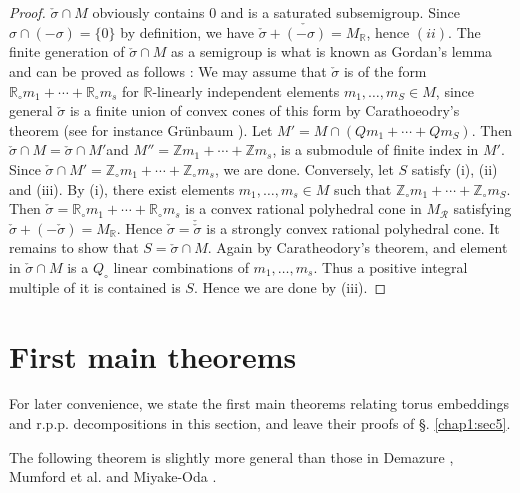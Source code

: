 \begin{proof}
$\check{\sigma} \cap M$ obviously contains 0 and is a saturated
  subsemigroup. Since $\sigma \cap (- \sigma) = \{ 0\}$ by definition,
  we have $\check{\sigma} + \check{(-\sigma)} = M_{\mathbb{R}}$, hence
  $(ii)$. The finite generation of $\check{\sigma} \cap M$ as a
  semigroup is what is known as Gordan's lemma and can be proved as
  follows : We may assume that $\check{\sigma}$ is of the form
  $\mathbb{R}_\circ m_1 +\cdots + \mathbb{R}_\circ m_s$ for
  $\mathbb{R}$-linearly independent elements $m_1 , \ldots , m_S \in
  M$, since general $\check{\sigma}$ is a finite union of convex cones
  of this form by Carathoeodry's theorem (see for instance
  Gr\"{u}nbaum  \cite{keyG3}). Let $M' = M \cap (Qm_1+\cdots+ Qm_S)$. Then
  $\check{\sigma}\cap M = \check{\sigma} \cap M'$\pageoriginale and
  $M''=\mathbb{Z} m_1+\cdots+\mathbb{Z} m_s$, is a submodule of finite
  index in $M'$. Since $\check{\sigma} \cap M' = \mathbb{Z}_\circ m_1
  + \cdots + \mathbb{Z}_\circ m_s $, we are done. Conversely, let 
  $S$ satisfy (i), (ii) and (iii). By (i), there exist elements
  $m_1 , \ldots, m_s \in M$ such that $\mathbb{Z}_\circ m_1 +\cdots +
  \mathbb{Z}_\circ m_S$. Then $\check{\sigma} = \mathbb{R}_\circ m_1
  +\cdots + \mathbb{R}_\circ m_s$ is a convex rational polyhedral cone
  in $M_{\mathscr{R}}$ satisfying $\check{\sigma} + (-\check{\sigma})
  = M_{\mathbb{R}}$. Hence $\check{\sigma} = \check{\check{\sigma}} $ is a
  strongly convex rational polyhedral cone. It remains to show that $S
  = \check{\sigma} \cap M$. Again by Caratheodory's theorem, and
  element in $\check{\sigma} \cap M$ is a $Q_\circ$ linear
  combinations of $m_1 ,\ldots , m_s$. Thus a positive integral
  multiple of it is contained is $S$. Hence we are done by (iii).  
\end{proof}

\section{First main theorems}\label{chap1:sec4}

	For later convenience, we state the first main theorems
        relating torus embeddings and r.p.p. decompositions in this
        section, and leave their proofs of \S. \ref{chap1:sec5}.  

	The following theorem is slightly more general than those in
        Demazure \cite[\S. \ref{chap1:sec4}]{keyD2}, Mumford et
        al.\cite[I.2, Thm.6]{keyTE} 
        and Miyake-Oda \cite{keyMO}.  

